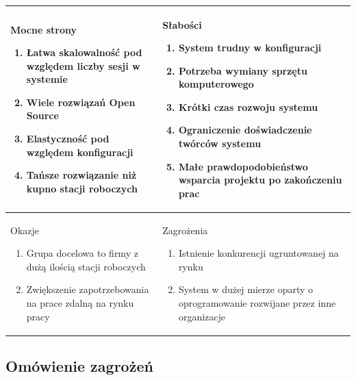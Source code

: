 \documentclass[12pt]{article}
\begin{document}
\begin{center}
	\begin{tabular}{| p{} | p{} |}
		\hline
		Mocne strony
		\begin{enumerate}
			\item Łatwa skalowalność pod względem liczby sesji w systemie
			\item Wiele rozwiązań Open Source
			\item Elastyczność pod względem konfiguracji
			\item Tańsze rozwiązanie niż kupno stacji roboczych
		\end{enumerate}
		 &
		Słabości
		\begin{enumerate}
			\item System trudny w konfiguracji
			\item Potrzeba wymiany sprzętu komputerowego
			\item Krótki czas rozwoju systemu
			\item Ograniczenie doświadczenie twórców systemu
			\item Małe prawdopodobieństwo wsparcia projektu po zakończeniu prac
		\end{enumerate}
		\\ \hline

		Okazje
		\begin{enumerate}
			\item Grupa docelowa to firmy z dużą ilością stacji roboczych
			\item Zwiększenie zapotrzebowania na prace zdalną na rynku pracy
		\end{enumerate}
		 &

		Zagrożenia
		\begin{enumerate}
			\item Istnienie konkurencji ugruntowanej na rynku
			\item System w dużej mierze oparty o oprogramowanie rozwijane przez inne organizacje
		\end{enumerate}
		\\ \hline
	\end{tabular}
\end{center}

\subsection{Omówienie zagrożeń}
\end{document}
